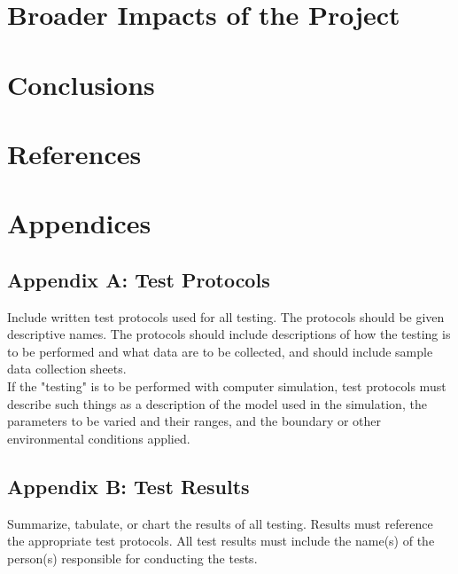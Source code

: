 \documentclass[12pt,a4paper]{report}
\begin{document}
\section{Broader Impacts of the Project}
\blindtext
\section{Conclusions}
\blindtext
\section{References}

 

\section{Appendices}
\blindtext


\subsection{Appendix A: Test Protocols}
Include written test protocols used for all testing.  The protocols should be given descriptive names. The protocols should include descriptions of how the testing is to be performed and what data are to be collected, and should include sample data collection sheets.\\
If the "testing" is to be performed with computer simulation, test protocols must describe such things as a description of the model used in the simulation, the parameters to be varied and their ranges, and the boundary or other environmental conditions applied.\\


\subsection{Appendix B: Test Results}
Summarize, tabulate, or chart the results of all testing. Results must reference the appropriate test protocols.  All test results must include the name(s) of the person(s) responsible for conducting the tests.\\
\end{document}
